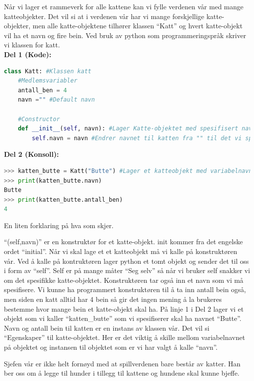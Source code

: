 Når vi lager et rammeverk for alle kattene kan vi fylle verdenen vår med mange katteobjekter. Det vil si at i verdenen vår har vi mange forskjellige katte-objekter, men alle katte-objektene tilhører klassen ``Katt'' og hvert katte-objekt vil ha et navn og fire bein. Ved bruk av python som programmeringspråk skriver vi klassen for katt.\\[0.5cm]
\textbf{Del 1 (Kode):}
\begin{lstlisting}[language=python]
class Katt: #Klassen katt
    #Medlemsvariabler
    antall_ben = 4 
    navn ="" #Default navn
    
    #Constructor
    def __init__(self, navn): #Lager Katte-objektet med spesifisert navn
        self.navn = navn #Endrer navnet til katten fra "" til det vi spesifiserte

\end{lstlisting}
\textbf{Del 2 (Konsoll):}
\begin{lstlisting}[language=python]
>>> katten_butte = Katt("Butte") #Lager et katteobjekt med variabelnavn "katten_butte"
>>> print(katten_butte.navn) 
Butte
>>> print(katten_butte.antall_ben) 
4
\end{lstlisting}

En liten forklaring på hva som skjer.

``\twound{\text{ }}(self,navn)'' er en konstruktør for et katte-objekt. init kommer fra det engelske ordet ``initial''. Når vi skal lage et et katteobjekt må vi kalle på konstruktøren vår. Ved å kalle på kontruktøren lager python et tomt objekt og sender det til oss i form av ``self''. Self er på mange måter ``Seg selv'' så når vi bruker self snakker vi om det spesifikke katte-objektet. Konstruktøren tar også inn et navn som vi må spesifisere. Vi kunne ha programmert konstruktøren til å ta inn antall bein også, men siden en katt alltid har 4 bein så gir det ingen mening å la brukeres bestemme hvor mange bein et katte-objekt skal ha. På linje 1 i Del 2 lager vi et objekt som vi kaller ``katten\_butte'' som vi spesifiserer skal ha navnet ``Butte''. Navn og antall bein til katten er en instans av klassen vår. Det vil si ``Egenskaper'' til katte-objektet. Her er det viktig å skille mellom variabelnavnet på objektet og instansen til objektet som er vi har valgt å kalle ``navn''.

Sjefen vår er ikke helt fornøyd med at spillverdenen bare består av katter. Han ber oss om å legge til hunder i tillegg til kattene og hundene skal kunne bjeffe.

